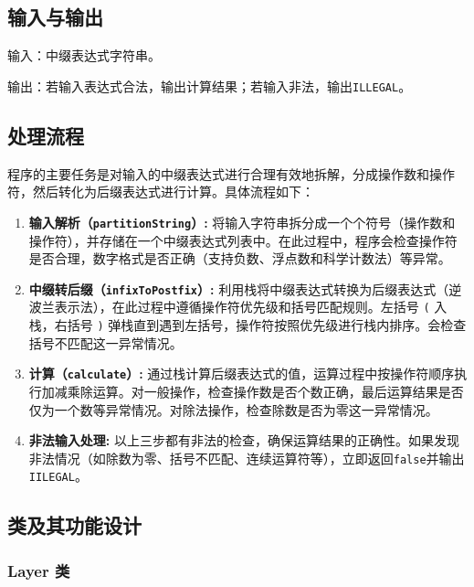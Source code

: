 \documentclass[UTF8]{ctexart}
\begin{document}
\subsection{输入与输出}

输入：中缀表达式字符串。

输出：若输入表达式合法，输出计算结果；若输入非法，输出\texttt{ILLEGAL}。

\subsection{处理流程}

程序的主要任务是对输入的中缀表达式进行合理有效地拆解，分成操作数和操作符，然后转化为后缀表达式进行计算。具体流程如下：

\begin{enumerate}
    \item \textbf{输入解析（\texttt{partitionString}）:} 将输入字符串拆分成一个个符号（操作数和操作符），并存储在一个中缀表达式列表中。在此过程中，程序会检查操作符是否合理，数字格式是否正确（支持负数、浮点数和科学计数法）等异常。
    
    \item \textbf{中缀转后缀（\texttt{infixToPostfix}）:} 利用栈将中缀表达式转换为后缀表达式（逆波兰表示法），在此过程中遵循操作符优先级和括号匹配规则。左括号 \texttt{(} 入栈，右括号 \texttt{)} 弹栈直到遇到左括号，操作符按照优先级进行栈内排序。会检查括号不匹配这一异常情况。
    
    \item \textbf{计算（\texttt{calculate}）:} 通过栈计算后缀表达式的值，运算过程中按操作符顺序执行加减乘除运算。对一般操作，检查操作数是否个数正确，最后运算结果是否仅为一个数等异常情况。对除法操作，检查除数是否为零这一异常情况。
    
    \item \textbf{非法输入处理:} 以上三步都有非法的检查，确保运算结果的正确性。如果发现非法情况（如除数为零、括号不匹配、连续运算符等），立即返回\texttt{false}并输出\texttt{IILEGAL}。
\end{enumerate}

\subsection{类及其功能设计}

\subsubsection{Layer 类}
\end{document}
